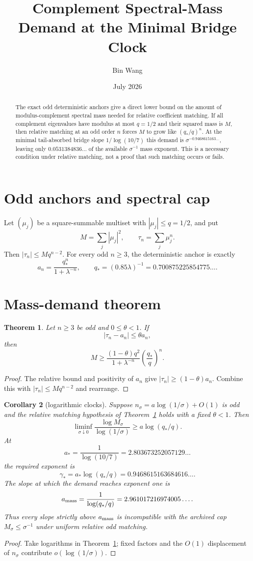 \documentclass[11pt]{article}
\title{Complement Spectral-Mass Demand at the Minimal Bridge Clock}
\author{Bin Wang}\date{July 2026}
\newtheorem{theorem}{Theorem}[section]
\newtheorem{corollary}[theorem]{Corollary}
\theoremstyle{remark}\newtheorem{remark}[theorem]{Remark}
\begin{document}
\maketitle
\begin{abstract}
The exact odd deterministic anchors give a direct lower bound on the amount
of modulus-complement spectral mass needed for relative coefficient
matching.  If all complement eigenvalues have modulus at most $q=1/2$ and
their squared mass is $M$, then relative matching at an odd order $n$ forces
$M$ to grow like $(q_*/q)^n$.  At the minimal tail-absorbed bridge slope
$1/\log(10/7)$ this demand is
$\sigma^{-0.9468615163\ldots}$, leaving only
$0.0531384836\ldots$ of the available $\sigma^{-1}$ mass exponent.  This is
a necessary condition under relative matching, not a proof that such
matching occurs or fails.
\end{abstract}

\section{Odd anchors and spectral cap}
Let $(\mu_j)$ be a square-summable multiset with
$|\mu_j|\le q=1/2$, and put
\[
 M=\sum_j|\mu_j|^2,
 \qquad \tau_n=\sum_j\mu_j^n.
\]
Then $|\tau_n|\le Mq^{n-2}$.  For every odd $n\ge3$, the deterministic
anchor is exactly
\[
 a_n=\frac{q_*^n}{1+\lambda^{-n}},\qquad
 q_*=(0.85\lambda)^{-1}=0.700875225854775\ldots.
\]

\section{Mass-demand theorem}
\begin{theorem}\label{thm:mass}
Let $n\ge3$ be odd and $0\le\theta<1$.  If
\[
 |\tau_n-a_n|\le\theta a_n,
\]
then
\[
 \boxed{
 M\ge
 \frac{(1-\theta)q^2}{1+\lambda^{-n}}
 \left(\frac{q_*}{q}\right)^n.}
\]
\end{theorem}
\begin{proof}
The relative bound and positivity of $a_n$ give
$|\tau_n|\ge(1-\theta)a_n$.  Combine this with
$|\tau_n|\le Mq^{n-2}$ and rearrange.
\end{proof}

\begin{corollary}[logarithmic clocks]\label{cor:clock}
Suppose $n_\sigma=a\log(1/\sigma)+O(1)$ is odd and the relative matching
hypothesis of Theorem~\ref{thm:mass} holds with a fixed $\theta<1$.  Then
\[
 \liminf_{\sigma\downarrow0}
 \frac{\log M_\sigma}{\log(1/\sigma)}
 \ge a\log(q_*/q).
\]
At
\[
 a_*=\frac1{\log(10/7)}=2.803673252057129\ldots
\]
the required exponent is
\[
 \gamma_*=a_*\log(q_*/q)
 =0.9468615163684616\ldots.
\]
The slope at which the demand reaches exponent one is
\[
 a_{\rm mass}=\frac1{\log(q_*/q)}
 =2.961017216974005\ldots.
\]
Thus every slope strictly above $a_{\rm mass}$ is incompatible with the
archived cap $M_\sigma\le\sigma^{-1}$ under uniform relative odd matching.
\end{corollary}
\begin{proof}
Take logarithms in Theorem~\ref{thm:mass}; fixed factors and the
$O(1)$ displacement of $n_\sigma$ contribute $o(\log(1/\sigma))$.
\end{proof}
\end{document}
